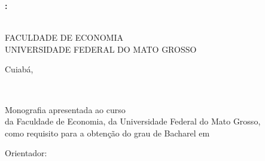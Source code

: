 \documentclass{tcc}
\begin{document}
\pagestyle{empty} %


\begin{center}
\LARGE{\bf \thetitle:}\\
\Large{\bf \subtitulo}\\
\end{center}

\vspace{1em}

\begin{center}
\theauthor
\end{center}

\vfill



\begin{center}
FACULDADE DE ECONOMIA \\
UNIVERSIDADE FEDERAL DO MATO GROSSO

\end{center}

\vspace{2in}

\begin{center}
Cuiabá, \the\year
\end{center}
\afterpage{\blankpage \addtocounter{page}{1}} %

\newpage
\begin{center}
\theauthor
\end{center}
\vspace{3in}
\begin{center}
\LARGE{\thetitle}\\
\end{center}

\vspace{2in}

\begin{flushright}
Monografia apresentada ao curso \nomedocurso \\ da Faculdade de Economia, da Universidade Federal do Mato Grosso, \\ como requisito para a obtenção do grau de Bacharel em \titulobar
\\
\vspace{0.2in}

Orientador: \orientador


\end{flushright}
\end{document}
